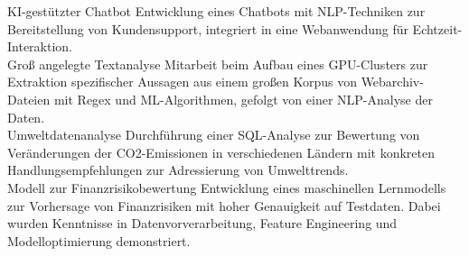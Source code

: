 \documentclass[9pt,a4paper,ragged2e,withhyper]{altacv}
\begin{document}
\begin{paracol}{2}
        \cvevent
            { KI-gestützter Chatbot }
            {  }
            {}
            {}
        Entwicklung eines Chatbots mit NLP-Techniken zur Bereitstellung von Kundensupport, integriert in eine Webanwendung für Echtzeit-Interaktion.\\
        \vspace{0.5em}
        \cvevent
            { Groß angelegte Textanalyse }
            {  }
            {}
            {}
        Mitarbeit beim Aufbau eines GPU-Clusters zur Extraktion spezifischer Aussagen aus einem großen Korpus von Webarchiv-Dateien mit Regex und ML-Algorithmen, gefolgt von einer NLP-Analyse der Daten.\\
        \vspace{0.5em}
        \cvevent
            { Umweltdatenanalyse }
            {  }
            {}
            {}
        Durchführung einer SQL-Analyse zur Bewertung von Veränderungen der CO2-Emissionen in verschiedenen Ländern mit konkreten Handlungsempfehlungen zur Adressierung von Umwelttrends.\\
        \vspace{0.5em}
        \cvevent
            { Modell zur Finanzrisikobewertung }
            {  }
            {}
            {}
        Entwicklung eines maschinellen Lernmodells zur Vorhersage von Finanzrisiken mit hoher Genauigkeit auf Testdaten. Dabei wurden Kenntnisse in Datenvorverarbeitung, Feature Engineering und Modelloptimierung demonstriert.\\
        \vspace{0.5em}

        
    \end{paracol}
\end{document}

